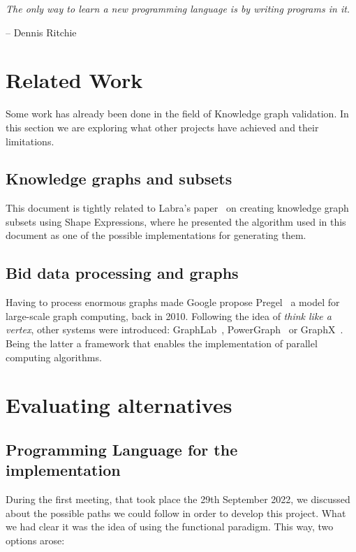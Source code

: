\epigraph{\textit{The only way to learn a new programming language is by writing programs in it.}}{-- \textup{Dennis Ritchie}}

\section{Related Work}

Some work has already been done in the field of Knowledge graph validation. In this section we are exploring what other projects have achieved and their limitations.

\subsection{Knowledge graphs and subsets}

This document is tightly related to Labra's paper~\cite{https://doi.org/10.48550/arxiv.2110.11709} on creating knowledge graph subsets using Shape Expressions, where he presented the algorithm used in this document as one of the possible implementations for generating them.

\subsection{Bid data processing and graphs}

Having to process enormous graphs made Google propose Pregel~\cite{10.1145/1807167.1807184} a model for large-scale graph computing, back in 2010. Following the idea of \textit{think like a vertex}, other systems were introduced: GraphLab~\cite{10.14778/2212351.2212354}, PowerGraph~\cite{180251} or GraphX~\cite{186216}. Being the latter a framework that enables the implementation of parallel computing algorithms.

\section{Evaluating alternatives}

\subsection{Programming Language for the implementation}

During the first meeting, that took place the 29th September 2022, we discussed about the possible paths we could follow in order to develop this project. What we had clear it was the idea of using the functional paradigm. This way, two options arose:

